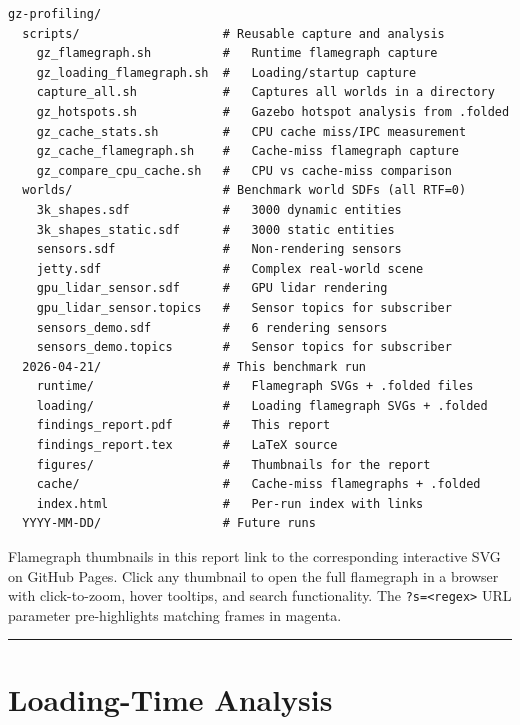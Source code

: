 \documentclass[11pt, a4paper]{article}
\begin{document}
\begin{verbatim}
gz-profiling/
  scripts/                    # Reusable capture and analysis
    gz_flamegraph.sh          #   Runtime flamegraph capture
    gz_loading_flamegraph.sh  #   Loading/startup capture
    capture_all.sh            #   Captures all worlds in a directory
    gz_hotspots.sh            #   Gazebo hotspot analysis from .folded
    gz_cache_stats.sh         #   CPU cache miss/IPC measurement
    gz_cache_flamegraph.sh    #   Cache-miss flamegraph capture
    gz_compare_cpu_cache.sh   #   CPU vs cache-miss comparison
  worlds/                     # Benchmark world SDFs (all RTF=0)
    3k_shapes.sdf             #   3000 dynamic entities
    3k_shapes_static.sdf      #   3000 static entities
    sensors.sdf               #   Non-rendering sensors
    jetty.sdf                 #   Complex real-world scene
    gpu_lidar_sensor.sdf      #   GPU lidar rendering
    gpu_lidar_sensor.topics   #   Sensor topics for subscriber
    sensors_demo.sdf          #   6 rendering sensors
    sensors_demo.topics       #   Sensor topics for subscriber
  2026-04-21/                 # This benchmark run
    runtime/                  #   Flamegraph SVGs + .folded files
    loading/                  #   Loading flamegraph SVGs + .folded
    findings_report.pdf       #   This report
    findings_report.tex       #   LaTeX source
    figures/                  #   Thumbnails for the report
    cache/                    #   Cache-miss flamegraphs + .folded
    index.html                #   Per-run index with links
  YYYY-MM-DD/                 # Future runs
\end{verbatim}

Flamegraph thumbnails in this report link to the corresponding interactive SVG on GitHub Pages. Click any thumbnail to open the full flamegraph in a browser with click-to-zoom, hover tooltips, and search functionality. The \texttt{?s=<regex>} URL parameter pre-highlights matching frames in magenta.

\begin{center}\rule{0.5\linewidth}{0.5pt}\end{center}

\hypertarget{loading-time-analysis}{%
\section{Loading-Time Analysis}\label{loading-time-analysis}}
\end{document}
